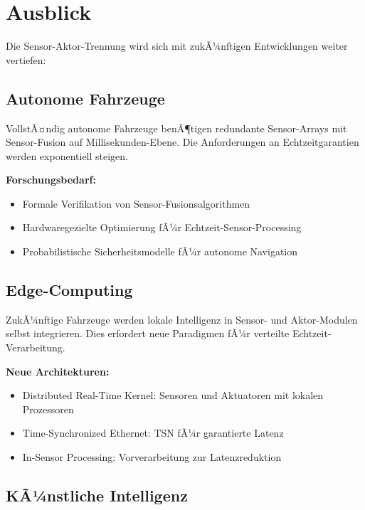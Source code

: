 ﻿\documentclass[a4paper,12pt]{article}
\begin{document}
\section{Ausblick}

Die Sensor-Aktor-Trennung wird sich mit zukÃ¼nftigen Entwicklungen weiter vertiefen:

\subsection{Autonome Fahrzeuge}

VollstÃ¤ndig autonome Fahrzeuge benÃ¶tigen redundante Sensor-Arrays mit Sensor-Fusion 
auf Millisekunden-Ebene. Die Anforderungen an Echtzeitgarantien werden exponentiell steigen.

\textbf{Forschungsbedarf:}
\begin{itemize}
	\item Formale Verifikation von Sensor-Fusionsalgorithmen
	\item Hardwaregezielte Optimierung fÃ¼r Echtzeit-Sensor-Processing
	\item Probabilistische Sicherheitsmodelle fÃ¼r autonome Navigation
\end{itemize}

\subsection{Edge-Computing}

ZukÃ¼nftige Fahrzeuge werden lokale Intelligenz in Sensor- und Aktor-Modulen selbst 
integrieren. Dies erfordert neue Paradigmen fÃ¼r verteilte Echtzeit-Verarbeitung.

\textbf{Neue Architekturen:}
\begin{itemize}
	\item Distributed Real-Time Kernel: Sensoren und Aktuatoren mit lokalen Prozessoren
	\item Time-Synchronized Ethernet: TSN fÃ¼r garantierte Latenz
	\item In-Sensor Processing: Vorverarbeitung zur Latenzreduktion
\end{itemize}

\subsection{KÃ¼nstliche Intelligenz}
\end{document}
